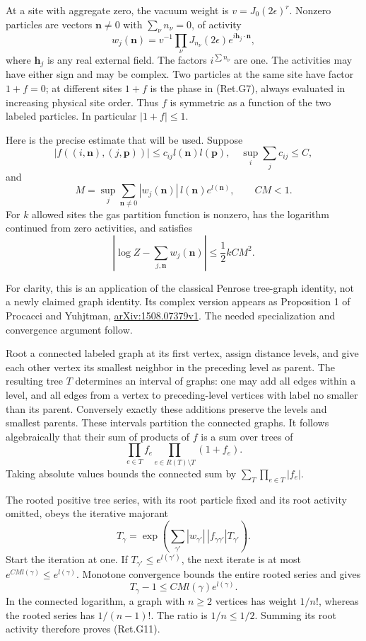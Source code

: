 At a site with aggregate zero, the vacuum weight is
\(v=J_0(2\epsilon)^r\). Nonzero particles are vectors
\(\boldsymbol n\ne0\) with \(\sum_\nu n_\nu=0\), of activity
\[
 w_j(\boldsymbol n)
 =v^{-1}\prod_\nu J_{n_\nu}(2\epsilon)
                         e^{i\boldsymbol h_j\cdot\boldsymbol n},
                                                               \tag{Ret.G10}
\]
where \(\boldsymbol h_j\) is any real external field.
The factors \(i^{\sum n_\nu}\) are one. The activities may have either sign
and may be complex. Two particles at the same site have factor \(1+f=0\);
at different sites \(1+f\) is the phase in (Ret.G7), always evaluated in
increasing physical site order. Thus \(f\) is symmetric as a function
of the two labeled particles.
In particular \(|1+f|\le1\).

Here is the precise estimate that will be used. Suppose
\[
 |f((i,\boldsymbol n),(j,\boldsymbol p))|
       \le c_{ij}l(\boldsymbol n)l(\boldsymbol p),\quad
 \sup_i\sum_j c_{ij}\le C,
\]
and
\[
 M=\sup_j\sum_{\boldsymbol n\ne0}
              |w_j(\boldsymbol n)|\,l(\boldsymbol n)e^{l(\boldsymbol n)},
 \qquad CM<1.
\]
For \(k\) allowed sites the gas partition function is nonzero, has the
logarithm continued from zero activities, and satisfies
\[
 \left|\log Z-\sum_{j,\boldsymbol n}w_j(\boldsymbol n)\right|
                              \le\frac12 kCM^2.             \tag{Ret.G11}
\]

For clarity, this is an application of the classical Penrose
tree-graph identity, not a newly claimed graph identity. Its complex
version appears as Proposition 1 of Procacci and Yuhjtman,
\href{https://arxiv.org/pdf/1508.07379v1}{arXiv:1508.07379v1}.
The needed specialization and convergence argument follow.

Root a connected labeled graph at its first vertex, assign distance levels,
and give each other vertex its smallest neighbor in the preceding level
as parent. The resulting tree \(T\) determines an interval of graphs:
one may add all edges within a level, and all edges from a vertex to
preceding-level vertices with label no smaller than its parent.
Conversely exactly these additions preserve the levels and smallest parents.
These intervals partition the connected graphs. It follows algebraically
that their sum of products of \(f\) is a sum over trees of
\[
 \prod_{e\in T}f_e\prod_{e\in R(T)\setminus T}(1+f_e).
\]
Taking absolute values bounds the connected sum by
\(\sum_T\prod_{e\in T}|f_e|\).

The rooted positive tree series, with its root particle fixed and
its root activity omitted, obeys the iterative majorant
\[
 T_\gamma=\exp\left(\sum_{\gamma'}
                  |w_{\gamma'}|\,|f_{\gamma\gamma'}|T_{\gamma'}\right).
\]
Start the iteration at one. If \(T_{\gamma'}\le e^{l(\gamma')}\),
the next iterate is at most \(e^{CMl(\gamma)}\le e^{l(\gamma)}\).
Monotone convergence bounds the entire rooted series and gives
\[
 T_\gamma-1\le CMl(\gamma)e^{l(\gamma)}.
\]
In the connected logarithm, a graph with \(n\ge2\) vertices has weight
\(1/n!\), whereas the rooted series has \(1/(n-1)!\). The ratio is
\(1/n\le1/2\). Summing its root activity therefore proves (Ret.G11).

